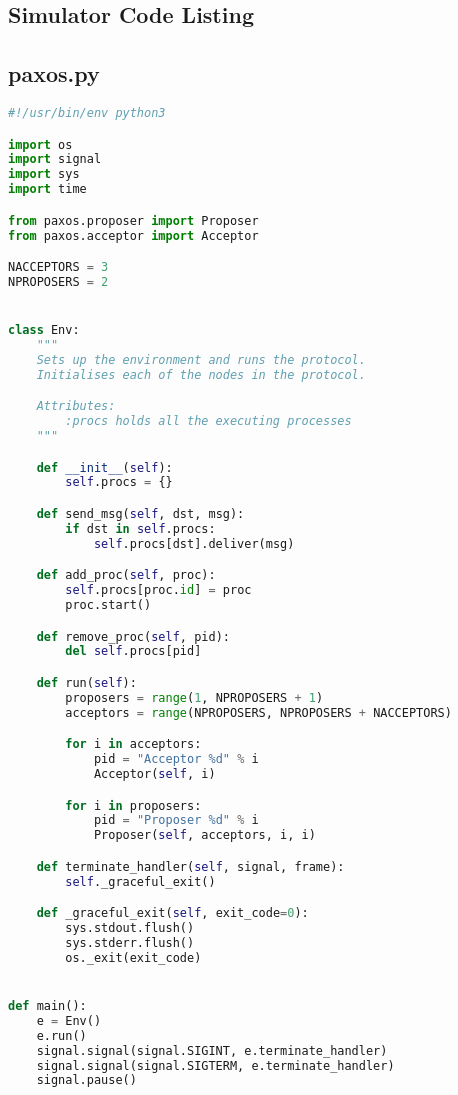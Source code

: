 \begin{landscape}

\chapter{Simulator Code Listing}

\section{paxos.py}
\begin{multicols*}{2}
\begin{lstlisting}[style=SourceCodeListing,language=Python]
#!/usr/bin/env python3

import os
import signal
import sys
import time

from paxos.proposer import Proposer
from paxos.acceptor import Acceptor

NACCEPTORS = 3
NPROPOSERS = 2


class Env:
    """
    Sets up the environment and runs the protocol.
    Initialises each of the nodes in the protocol.

    Attributes:
        :procs holds all the executing processes
    """

    def __init__(self):
        self.procs = {}

    def send_msg(self, dst, msg):
        if dst in self.procs:
            self.procs[dst].deliver(msg)

    def add_proc(self, proc):
        self.procs[proc.id] = proc
        proc.start()

    def remove_proc(self, pid):
        del self.procs[pid]

    def run(self):
        proposers = range(1, NPROPOSERS + 1)
        acceptors = range(NPROPOSERS, NPROPOSERS + NACCEPTORS)

        for i in acceptors:
            pid = "Acceptor %d" % i
            Acceptor(self, i)

        for i in proposers:
            pid = "Proposer %d" % i
            Proposer(self, acceptors, i, i)

    def terminate_handler(self, signal, frame):
        self._graceful_exit()

    def _graceful_exit(self, exit_code=0):
        sys.stdout.flush()
        sys.stderr.flush()
        os._exit(exit_code)


def main():
    e = Env()
    e.run()
    signal.signal(signal.SIGINT, e.terminate_handler)
    signal.signal(signal.SIGTERM, e.terminate_handler)
    signal.pause()



\end{lstlisting}
\end{multicols*}
\end{landscape}
